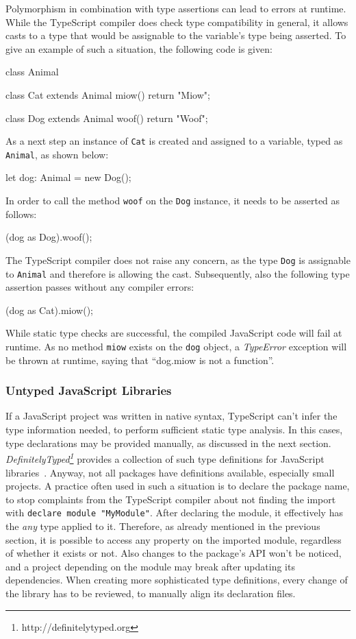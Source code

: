 Polymorphism in combination with type assertions can lead to errors at runtime. While the TypeScript compiler does check type compatibility in general, it allows casts to a type that would be assignable to the variable's type being asserted. To give an example of such a situation, the following code is given:
\begin{JsCode}[numbers=none]
class Animal { }

class Cat extends Animal {
  miow() {
    return "Miow";
  }
}

class Dog extends Animal {
  woof() {
    return "Woof";
  }
}
\end{JsCode}
As a next step an instance of \texttt{Cat} is created and assigned to a variable, typed as \texttt{Animal}, as shown below:
\begin{JsCode}[numbers=none]
let dog: Animal = new Dog();
\end{JsCode}
In order to call the method \texttt{woof} on the \texttt{Dog} instance, it needs to be asserted as follows:
\begin{JsCode}[numbers=none]
(dog as Dog).woof();
\end{JsCode}
The TypeScript compiler does not raise any concern, as the type \texttt{Dog} is assignable to \texttt{Animal} and therefore is allowing the cast. Subsequently, also the following type assertion passes without any compiler errors:
\begin{JsCode}[numbers=none]
(dog as Cat).miow();
\end{JsCode}
While static type checks are successful, the compiled JavaScript code will fail at runtime. As no method \texttt{miow} exists on the \texttt{dog} object, a \emph{TypeError} exception will be thrown at runtime, saying that ``dog.miow is not a function''.

\subsubsection{Untyped JavaScript Libraries}

If a JavaScript project was written in native syntax, TypeScript can't infer the type information needed, to perform sufficient static type analysis. In this cases, type declarations may be provided manually, as discussed in the next section. \emph{DefinitelyTyped\footnote{http://definitelytyped.org}} provides a collection of such type definitions for JavaScript libraries~\cite{DefinitelyTyped}. Anyway, not all packages have definitions available, especially small projects. A practice often used in such a situation is to declare the package name, to stop complaints from the TypeScript compiler about not finding the import with \texttt{declare module "MyModule"}.
After declaring the module, it effectively has the \emph{any} type applied to it. Therefore, as already mentioned in the previous section, it is possible to access any property on the imported module, regardless of whether it exists or not. Also changes to the package's API won't be noticed, and a project depending on the module may break after updating its dependencies. When creating more sophisticated type definitions, every change of the library has to be reviewed, to manually align its declaration files.

